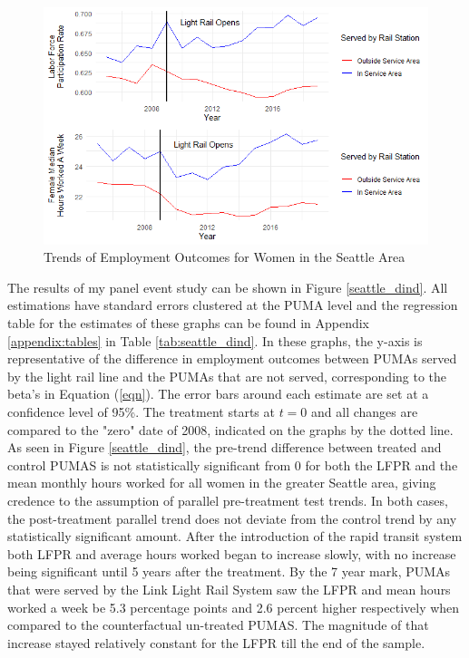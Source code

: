 \documentclass[A4paper,12pt]{article}
\begin{document}
\begin{figure}[hbt!]
\caption{Trends of Employment Outcomes for Women in the Seattle Area}
\label{seattle_emp}
\centering
\includegraphics[width=1\textwidth]{Graphs/emp_outcomes_seattle.png}
\end{figure}
\FloatBarrier

The results of my panel event study can be shown in Figure \ref{seattle_dind}. All estimations have standard errors clustered at the PUMA level and the regression table for the estimates of these graphs can be found in Appendix \ref{appendix:tables} in Table \ref{tab:seattle_dind}. In these graphs, the y-axis is representative of the difference in employment outcomes between PUMAs served by the light rail line and the PUMAs that are not served, corresponding to the beta's in Equation (\ref{eqn}). The error bars around each estimate are set at a confidence level of 95\%. The treatment starts at $t = 0$ and all changes are compared to the "zero" date of 2008, indicated on the graphs by the dotted line.\\ 

As seen in Figure \ref{seattle_dind}, the pre-trend difference between treated and control PUMAS is not statistically significant from 0 for both the LFPR and the mean monthly hours worked for all women in the greater Seattle area, giving credence to the assumption of parallel pre-treatment test trends. In both cases, the post-treatment parallel trend does not deviate from the control trend by any statistically significant amount. After the introduction of the rapid transit system both LFPR and average hours worked began to increase slowly, with no increase being significant until 5 years after the treatment. By the 7 year mark, PUMAs that were served by the Link Light Rail System saw the LFPR and mean hours worked a week be 5.3 percentage points and 2.6 percent higher respectively when compared to the counterfactual un-treated PUMAS. The magnitude of that increase stayed relatively constant for the LFPR till the end of the sample.\\
\end{document}
